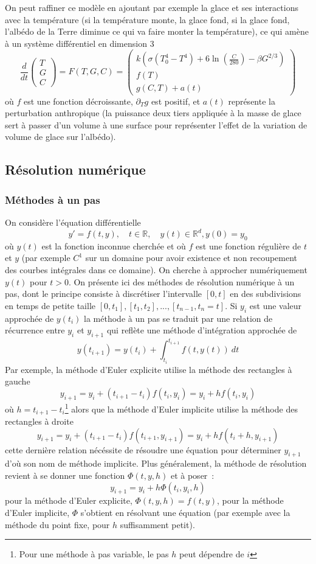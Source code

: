 \documentclass[a4paper,11pt]{article}
\newcommand{\R}{{\mathbb{R}}}
\begin{document}
On peut raffiner ce mod\`ele en ajoutant par exemple la glace
et ses interactions avec la temp\'erature (si la temp\'erature
monte, la glace fond, si la glace fond, l'alb\'edo de la Terre diminue
ce qui va faire monter la temp\'erature), ce qui am\`ene \`a un
syst\`eme diff\'erentiel en dimension 3
\[ \frac{d}{dt} \left(\begin{array}{c}
T \\
G \\
C
\end{array}\right) =
F(T,G,C) = \left(\begin{array}{c}
k (\sigma(T_0^4-T^4)+6 \ln(\frac{C}{280}) - \beta G^{2/3} ) \\
f(T) \\
g(C,T) + a(t)
\end{array}\right)
\]
o\`u $f$ est une fonction d\'ecroissante, $\partial_T g$ est positif,
et $a(t)$ repr\'esente la perturbation anthropique (la puissance deux
tiers appliqu\'ee \`a la masse de glace sert \`a passer d'un volume
\`a une surface pour repr\'esenter l'effet de la variation de volume
de glace sur l'alb\'edo).


\subsection{Résolution numérique}
\subsubsection{Méthodes à un pas}
On considère l'équation différentielle 
$$y'=f(t,y), \quad t \in \R, \quad y(t) \in \R^d, y(0)=y_0$$ 
o\`u $y(t)$ est la fonction inconnue cherchée
et où $f$ est une fonction régulière de $t$ et $y$ (par exemple
$C^1$ sur un domaine pour avoir existence et non recoupement des courbes
int\'egrales dans ce domaine).  On cherche
à approcher numériquement $y(t)$ pour $t>0$. 
On présente ici des méthodes de résolution numérique à un pas,
dont le principe consiste à discrétiser l'intervalle $[0,t]$ en des
subdivisions en temps de petite taille $[0,t_1], [t_1,t_2], ..., 
[t_{n-1},t_n=t]$. Si $y_i$ est une valeur approchée de $y(t_i)$
la méthode à un pas se traduit par une relation de récurrence entre
$y_i$ et $y_{i+1}$ qui reflète une méthode d'intégration
approchée de
$$ y(t_{i+1})=y(t_i)+\int_{t_i}^{t_{i+1}} f(t,y(t)) \ dt$$
Par exemple, la méthode d'Euler explicite 
utilise la méthode des
rectangles à gauche
$$ y_{i+1} = y_i + (t_{i+1}-t_i) f(t_i,y_i)=y_i+hf(t_i,y_i)$$
o\`u $h=t_{i+1}-t_i$\footnote{Pour une m\'ethode \`a pas variable,
le pas $h$ peut d\'ependre de $i$} 
alors que la méthode d'Euler implicite utilise la méthode 
des rectangles à droite
$$ y_{i+1} = y_i + (t_{i+1}-t_i) f(t_{i+1},y_{i+1})=y_i+hf(t_{i}+h,y_{i+1})$$
cette dernière relation nécéssite de résoudre une équation pour
déterminer $y_{i+1}$ d'où son nom de méthode implicite.
Plus g\'en\'eralement, la m\'ethode de r\'esolution revient \`a
se donner une fonction $\Phi(t,y,h)$ et \`a poser~:
$$ y_{i+1}=y_i+h\Phi(t_i,y_i,h)$$
pour la m\'ethode d'Euler explicite, $\Phi(t,y,h)=f(t,y)$, pour
la m\'ethode d'Euler implicite, $\Phi$ s'obtient en r\'esolvant une 
\'equation (par exemple avec la m\'ethode du point fixe, pour $h$
suffisamment petit).
\end{document}
